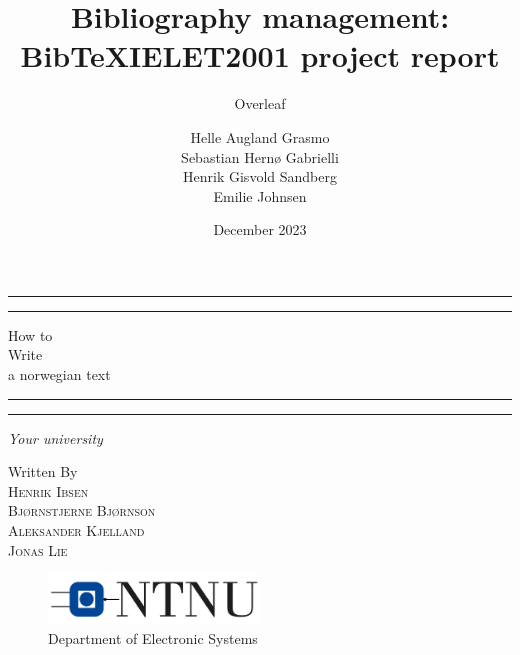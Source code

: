 \documentclass[11pt,English,a4paper]{article}
\title{Bibliography management: BibTeX}
\author{Overleaf}
\numberwithin{equation}{section} %
\numberwithin{table}{section}    %
\numberwithin{figure}{section}  %
\begin{document}
\thispagestyle{empty} %
\title{\textbf{IELET2001 project report}}
\author{Helle Augland Grasmo\\Sebastian Hernø Gabrielli\\Henrik Gisvold Sandberg\\Emilie Johnsen}
\date{December 2023}
\begin{titlepage}

	\centering 
	\scshape 
	\vspace*{\baselineskip}
	\rule{\textwidth}{0.4pt}\vspace*{-\baselineskip}\vspace{3.2pt} 
	\rule{\textwidth}{0.4pt}
 
	\vspace{0.75\baselineskip}
	{\LARGE How to\\ Write\\ a norwegian text\\} %
	\vspace{0.75\baselineskip} %
 
	\rule{\textwidth}{0.4pt}\vspace*{-\baselineskip}\vspace{3.2pt} %
	\rule{\textwidth}{0.4pt} %


        \vspace{0.5\baselineskip} 
	
	\textit{Your university\\}
        
	\vspace*{3\baselineskip} %
	Written By\\
	\vspace{0.5\baselineskip} %
	{\scshape Henrik Ibsen\\Bjørnstjerne Bjørnson\\Aleksander Kjelland\\Jonas Lie\\} %
	
	\vfill 
	
	\vspace{0.3\baselineskip} 
        \begin{figure}[b]
        \centering
        \includegraphics[width=0.5\textwidth]{Images/Logo.png}\\
    Department of Electronic Systems
        \end{figure}
\end{titlepage}
\end{document}
